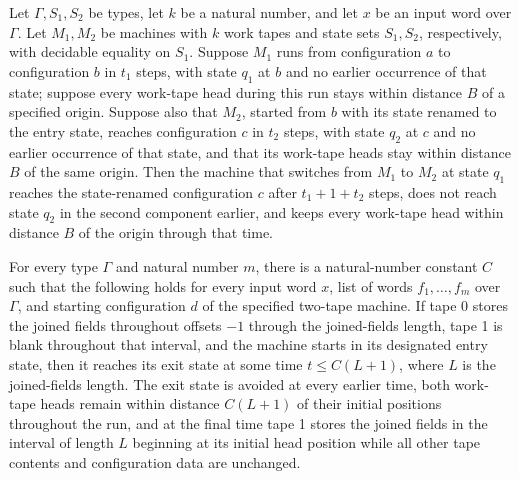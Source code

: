 \begin{theorem}
\label{Turing.rt_copy_seam}
\leanok
{}
Let $\Gamma,S_1,S_2$ be types, let $k$ be a natural number, and let $x$ be an input word
over $\Gamma$. Let $M_1,M_2$ be machines with $k$ work tapes and state sets $S_1,S_2$,
respectively, with decidable equality on $S_1$. Suppose $M_1$ runs from configuration
$a$ to configuration $b$ in $t_1$ steps, with state $q_1$ at $b$ and no earlier
occurrence of that state; suppose every work-tape head during this run stays within
distance $B$ of a specified origin. Suppose also that $M_2$, started from $b$ with its
state renamed to the entry state, reaches configuration $c$ in $t_2$ steps, with state
$q_2$ at $c$ and no earlier occurrence of that state, and that its work-tape heads stay
within distance $B$ of the same origin. Then the machine that switches from $M_1$ to
$M_2$ at state $q_1$ reaches the state-renamed configuration $c$ after $t_1+1+t_2$
steps, does not reach state $q_2$ in the second component earlier, and keeps every
work-tape head within distance $B$ of the origin through that time.
\end{theorem}

\begin{theorem}
\label{Turing.rt_copy_run}
\leanok
{}
For every type $\Gamma$ and natural number $m$, there is a natural-number constant $C$
such that the following holds for every input word $x$, list of words $f_1,\ldots,f_m$
over $\Gamma$, and starting configuration $d$ of the specified two-tape machine. If tape
0 stores the joined fields throughout offsets $-1$ through the joined-fields length,
tape 1 is blank throughout that interval, and the machine starts in its designated entry
state, then it reaches its exit state at some time $t\le C(L+1)$, where $L$ is the
joined-fields length. The exit state is avoided at every earlier time, both work-tape
heads remain within distance $C(L+1)$ of their initial positions throughout the run, and
at the final time tape 1 stores the joined fields in the interval of length $L$
beginning at its initial head position while all other tape contents and configuration
data are unchanged.
\end{theorem}

